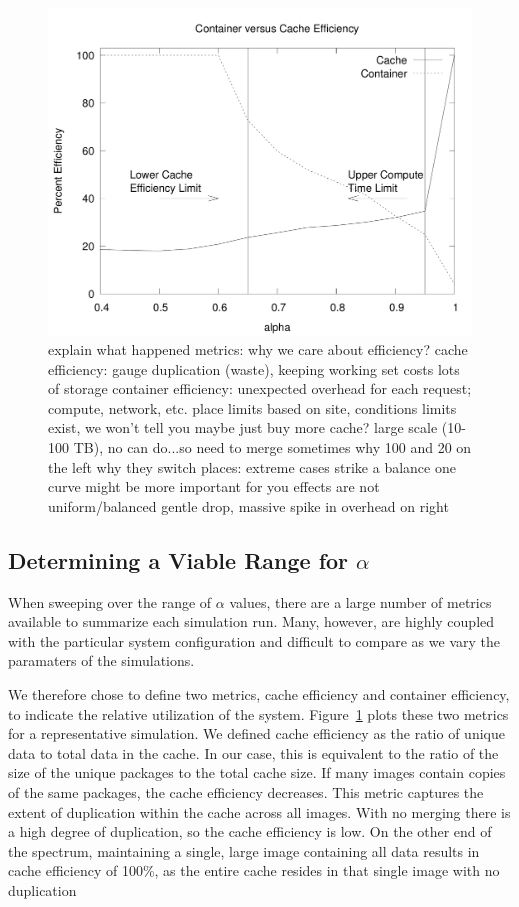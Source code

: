 \documentclass[sigconf]{acmart}
\begin{document}
\begin{figure}
\includegraphics[width=\linewidth]{curated/comparative/distribution_efficiency.pdf}
\label{fig:dist-eff}
explain what happened
metrics: why we care about efficiency?
cache efficiency: gauge duplication (waste), keeping working set costs lots of storage
container efficiency: unexpected overhead for each request; compute, network, etc.
place limits based on site, conditions
limits exist, we won't tell you
maybe just buy more cache?
large scale (10-100 TB), no can do...so need to merge sometimes
why 100 and 20 on the left
why they switch places: extreme cases
strike a balance
one curve might be more important for you
effects are not uniform/balanced gentle drop, massive spike in overhead on right
\fi
\end{figure}

\subsection{Determining a Viable Range for $\alpha$}

When sweeping over the range of $\alpha$ values,
there are a large number of metrics available to summarize each simulation run.
Many, however, are highly coupled with the particular system configuration and difficult to compare as we vary the paramaters of the simulations.

We therefore chose to define two metrics, cache efficiency and container efficiency,
to indicate the relative utilization of the system.
Figure~\ref{fig:dist-eff} plots these two metrics for a representative simulation.
We defined cache efficiency as the ratio of unique data to total data in the cache.
In our case, this is equivalent to the ratio of the size of the unique packages to the total cache size.
If many images contain copies of the same packages,
the cache efficiency decreases.
This metric captures the extent of duplication within the cache across all images.
With no merging there is a high degree of duplication,
so the cache efficiency is low.
On the other end of the spectrum,
maintaining a single, large image containing all data results in cache efficiency of 100\%,
as the entire cache resides in that single image with no duplication
\end{document}
